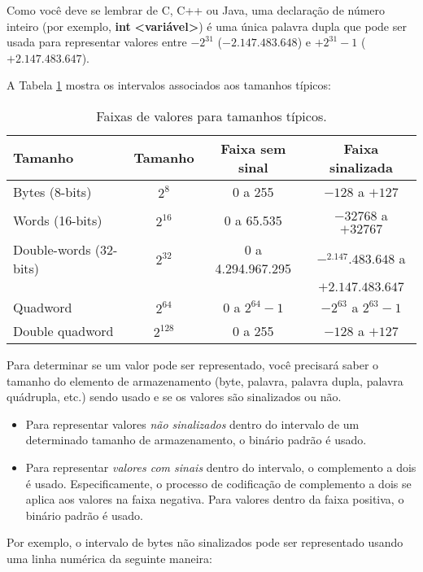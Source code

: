 Como você deve se lembrar de C, C++ ou Java, uma declaração de número inteiro (por exemplo, \textbf{int} \textbf{<variável>}) é uma única palavra dupla que pode ser usada para representar valores entre
 $ -2^{31} $ 
 ($-2.147.483.648$) e 
 $ +2^{31} - 1 $
  ($+ 2.147.483.647$).

A Tabela \ref{tab:faixas} mostra os intervalos associados aos tamanhos típicos:

\begin{table}[h]
	\centering
	\small
	\begin{tabular}{|l|c|c|c|}
		\hline
		\rowcolor[HTML]{C0C0C0} 
		\textbf{Tamanho} & \textbf{Tamanho} & \textbf{Faixa sem sinal} & \textbf{Faixa sinalizada} \\ \hline
		Bytes (8-bits) & $2^8$ & 0 a 255 & $-128$ a $+127$\\ \hline
		Words (16-bits) & $2^{16}$ & 0 a 65.535 & $-32768$ a $+32767$\\ \hline
		Double-words (32-bits) & $2^{32}$ & 0 a 4.294.967.295 & $-^2.147.483.648$ a\\
		&&& $+2.147.483.647$\\ \hline
		Quadword & $2^{64}$ & 0 a $2^{64}-1$ & $-2^{63}$ a $2^{63}-1$\\ \hline
		Double quadword & $2^{128}$ & 0 a 255 & $-128$ a $+127$\\ \hline
	\end{tabular}
	
	\caption{Faixas de valores para tamanhos típicos.}
	\label{tab:faixas}
\end{table}

Para determinar se um valor pode ser representado, você precisará saber o tamanho do elemento de armazenamento (byte, palavra, palavra dupla, palavra quádrupla, etc.) sendo usado e se os valores são sinalizados ou não.

\begin{itemize}
	\item Para representar valores \textit{não sinalizados} dentro do intervalo de um determinado tamanho de armazenamento, o binário padrão é usado. 
	\item Para representar \textit{valores com sinais} dentro do intervalo, o complemento a dois é usado. Especificamente, o processo de codificação de complemento a dois se aplica aos valores na faixa negativa. Para valores dentro da faixa positiva, o binário padrão é usado.
\end{itemize}

Por exemplo, o intervalo de bytes não sinalizados pode ser representado usando uma linha numérica da seguinte maneira:

